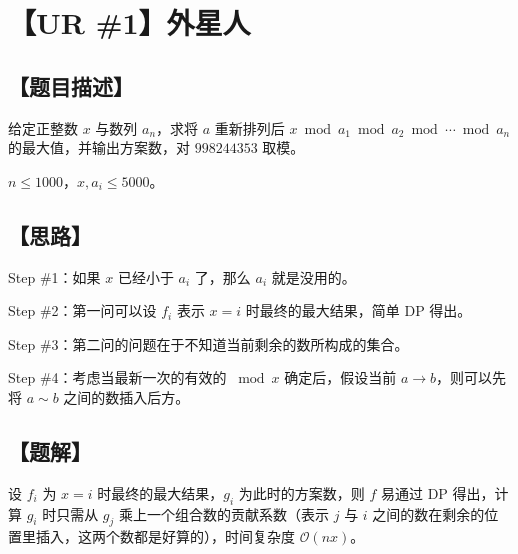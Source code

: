 \documentclass[UTF8,12pt,a4paper]{ctexart} %
\begin{document}
	\fontsize{12pt}{12pt}\selectfont
	
	\newpage
	\pagestyle{fancy}
	
	\section*{【UR \#1】外星人}
	
	\subsection*{【题目描述】}
	
	给定正整数 $x$ 与数列 $a_n$，求将 $a$ 重新排列后 $x\bmod a_1\bmod a_2\bmod\cdots\bmod a_n$ 的最大值，并输出方案数，对 $998244353$ 取模。
	
	$n\le1000$，$x,a_i\le5000$。
	
	\subsection*{【思路】}
	
	Step \#1：如果 $x$ 已经小于 $a_i$ 了，那么 $a_i$ 就是没用的。
	
	Step \#2：第一问可以设 $f_i$ 表示 $x=i$ 时最终的最大结果，简单 $\text{DP}$ 得出。
	
	Step \#3：第二问的问题在于不知道当前剩余的数所构成的集合。
	
	Step \#4：考虑当最新一次的有效的 $\bmod x$ 确定后，假设当前 $a\rightarrow b$，则可以先将 $a\sim b$ 之间的数插入后方。
	
	\subsection*{【题解】}
	
	设 $f_i$ 为 $x=i$ 时最终的最大结果，$g_i$ 为此时的方案数，则 $f$ 易通过 $\text{DP}$ 得出，计算 $g_i$ 时只需从 $g_j$ 乘上一个组合数的贡献系数（表示 $j$ 与 $i$ 之间的数在剩余的位置里插入，这两个数都是好算的），时间复杂度 $\mathcal{O}(nx)$。
	
	
\end{document}
